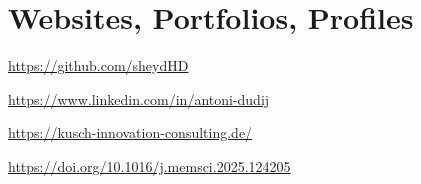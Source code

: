 \section{Websites, Portfolios, Profiles}

\begin{highlights}
    \item \href{https://github.com/sheydHD}{https://github.com/sheydHD}
    \item \href{https://www.linkedin.com/in/antoni-dudij}{https://www.linkedin.com/in/antoni-dudij}
    \item \href{https://kusch-innovation-consulting.de/}{https://kusch-innovation-consulting.de/}
    \item \href{https://doi.org/10.1016/j.memsci.2025.124205}{https://doi.org/10.1016/j.memsci.2025.124205}
\end{highlights}
